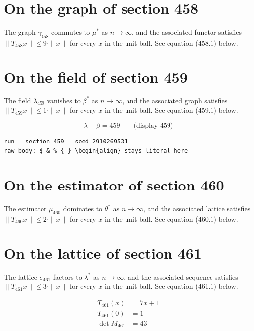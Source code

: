 \documentclass{article}
\begin{document}
\section{On the graph of section 458}
The graph $\gamma_{458}$ commutes to $\mu^{*}$ as $n \to \infty$,
and the associated functor satisfies $\|T_{458} x\| \leq 9 \cdot \|x\|$
for every $x$ in the unit ball. See equation (458.1) below.

\section{On the field of section 459}
The field $\lambda_{459}$ vanishes to $\beta^{*}$ as $n \to \infty$,
and the associated graph satisfies $\|T_{459} x\| \leq 1 \cdot \|x\|$
for every $x$ in the unit ball. See equation (459.1) below.

$$
\lambda + \beta = 459 \qquad \text{(display 459)}
$$

\begin{verbatim}
run --section 459 --seed 2910269531
raw body: $ & % { } \begin{align} stays literal here
\end{verbatim}

\section{On the estimator of section 460}
The estimator $\mu_{460}$ dominates to $\theta^{*}$ as $n \to \infty$,
and the associated lattice satisfies $\|T_{460} x\| \leq 2 \cdot \|x\|$
for every $x$ in the unit ball. See equation (460.1) below.

\section{On the lattice of section 461}
The lattice $\sigma_{461}$ factors to $\lambda^{*}$ as $n \to \infty$,
and the associated sequence satisfies $\|T_{461} x\| \leq 3 \cdot \|x\|$
for every $x$ in the unit ball. See equation (461.1) below.

\begin{align}
T_{461}(x) &= 7 x + 1 \\
T_{461}(0) &= 1 \\
\det M_{461} &= 43
\end{align}
\end{document}
